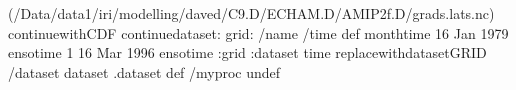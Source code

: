 \begin{ingrid}
(/Data/data1/iri/modelling/daved/C9.D/ECHAM.D/AMIP2f.D/grads.lats.nc) continuewithCDF
continuedataset: 
grid:
/name /time def
monthtime
16 Jan 1979 ensotime
1
16 Mar 1996 ensotime
:grid
:dataset
time replacewithdatasetGRID
/dataset dataset .dataset def
/myproc undef
\end{ingrid}
